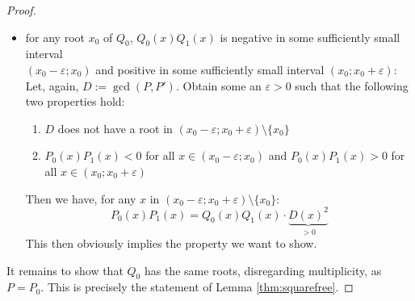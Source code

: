 \documentclass[11pt,a4paper,oneside]{article}
\renewcommand{\epsilon}{\varepsilon}
\begin{document}
\begin{proof}
\begin{itemize}
\newpage
\item for any root $x_0$ of $Q_0$, $Q_0(x)Q_1(x)$ is negative in some sufficiently small interval\\ \mbox{$(x_0-\epsilon;x_0)$} and positive in some sufficiently small interval $(x_0;x_0+\epsilon)$:\\
Let, again, $D:=\gcd(P, P')$. Obtain some an $\epsilon>0$ such that the following two properties hold:
\begin{enumerate}
\item $D$ does not have a root in $(x_0-\epsilon; x_0+\epsilon)\setminus\{x_0\}$
\item $P_0(x)P_1(x)<0$ for all $x\in (x_0-\epsilon; x_0)$ and $P_0(x)P_1(x)>0$ for all $x\in (x_0;x_0+\epsilon)$ %
\end{enumerate}
Then we have, for any $x$ in $(x_0-\epsilon; x_0+\epsilon)\setminus\{x_0\}$:
$$P_0(x)P_1(x) = Q_0(x)Q_1(x)\cdot \underbrace{D(x)^2}_{>0}$$
This then obviously implies the property we want to show.
\end{itemize}
\vskip3mm
It remains to show that $Q_0$ has the same roots, disregarding multiplicity, as $P = P_0$. This is precisely the statement of Lemma \ref{thm:squarefree}.
\end{proof}\vskip10mm
\end{document}
